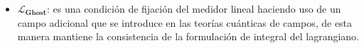 \begin{itemize}

\item $\mathcal{L}_{\mathbf{Ghost}}$: %
es una condición de fijación del medidor lineal haciendo uso de un campo adicional que se introduce en las teorías cuánticas de campos, de esta manera mantiene la consistencia de la formulación de integral del lagrangiano.%
%
\end{itemize}


